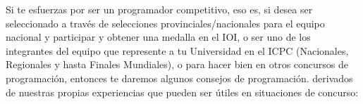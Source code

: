 Si te esfuerzas por ser un programador competitivo, eso es, si desea ser seleccionado a través de selecciones provinciales/nacionales para el equipo nacional y participar
y obtener una medalla en el IOI, o ser uno de los integrantes del equipo que represente a tu
Universidad en el ICPC  (Nacionales, Regionales y hasta Finales Mundiales), o para hacer
bien en otros concursos de programación, entonces te daremos algunos consejos de programación.
derivados de nuestras propias experiencias que pueden ser útiles en situaciones de concurso: